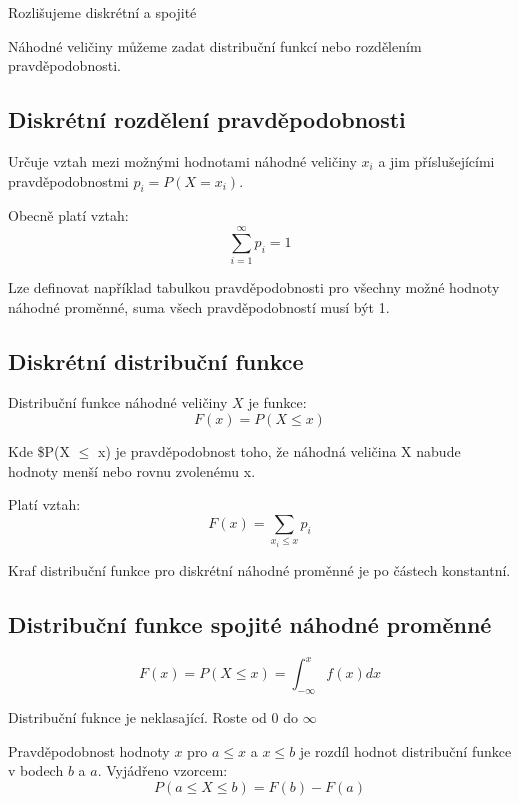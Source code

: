 \documentclass[11pt]{article}
\begin{document}
Rozlišujeme diskrétní a spojité

Náhodné veličiny můžeme zadat distribuční funkcí nebo rozdělením
pravděpodobnosti.

\subsection{Diskrétní rozdělení pravděpodobnosti}
\label{sec:orge2c187b}
Určuje vztah mezi možnými hodnotami náhodné veličiny \(x_i\) a jim příslušejícími
pravděpodobnostmi \(p_i = P(X = x_i)\).

Obecně platí vztah:
\begin{equation}
    \sum_{i=1}^\infty p_i = 1
\end{equation}

Lze definovat například tabulkou pravděpodobnosti pro všechny možné hodnoty
náhodné proměnné, suma všech pravděpodobností musí být 1.

\subsection{Diskrétní distribuční funkce}
\label{sec:org45694d5}
Distribuční funkce náhodné veličiny \(X\) je funkce:
\begin{equation}
    F(x) = P(X \leq x)
\end{equation}

Kde \$P(X \(\le\) x) je pravděpodobnost toho, že náhodná veličina X nabude hodnoty
menší nebo rovnu zvolenému x.

Platí vztah:
\begin{equation}
    F(x) = \sum_{x_i \leq x} p_i
\end{equation}

Kraf distribuční funkce pro diskrétní náhodné proměnné je po částech konstantní.

\subsection{Distribuční funkce spojité náhodné proměnné}
\label{sec:orgd1bf09b}
\begin{equation}
    F(x) = P(X \leq x) = \int_{-\infty}^x f(x) dx
\end{equation}

Distribuční fuknce je neklasající. Roste od 0 do \(\infty\)

Pravděpodobnost hodnoty \(x\) pro \(a \leq x\) a \(x \leq b\) je rozdíl hodnot
distribuční funkce v bodech \(b\) a \(a\). Vyjádřeno vzorcem:
\begin{equation}
    P(a \leq X \leq b) = F(b) - F(a)
\end{equation}
\end{document}
